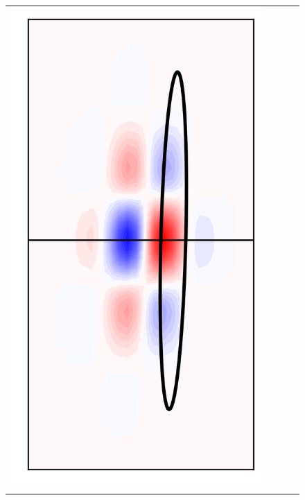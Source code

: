 \documentclass[10pt,final,xcolor=dvipsnames]{beamer}
\begin{document}
\begin{frame}
\begin{figure}
{\begin{tabular}{cccc}
	    \includegraphics[scale=0.2]{localpsf_revised_figures/frog_ellipsoid_a=27.0.png} & 

\end{tabular}}
\end{figure}
\end{frame}
\end{document}
